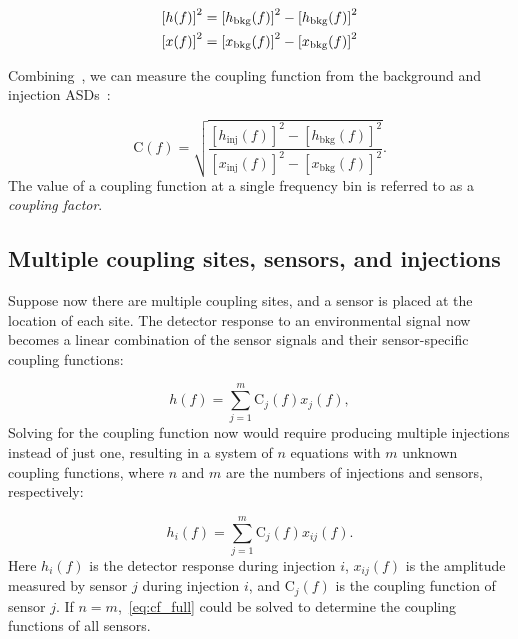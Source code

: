 \begin{align}
	\left[h(f)\right]^2 &= \left[h_{\textrm{bkg}}(f)\right]^2 - \left[h_{\textrm{bkg}}(f)\right]^2 \label{eq:h_inj}\\
	\left[x(f)\right]^2 &= \left[x_{\textrm{bkg}}(f)\right]^2 - \left[x_{\textrm{bkg}}(f)\right]^2 \label{eq:x_inj}
\end{align}

Combining~, we can measure the coupling function from the background and injection \acp{ASD}~\citep{Kruk_2016, pem_code}:

\begin{equation}\label{eq:cf}
	\mathrm{C}(f) = \sqrt{\frac{[h_{\textrm{inj}}(f)]^2 - [h_{\textrm{bkg}}(f)]^2}{[x_{\textrm{inj}}(f)]^2 - [x_{\textrm{bkg}}(f)]^2}}.
\end{equation}
The value of a coupling function at a single frequency bin is referred to as a \textit{coupling factor}.

\subsection{Multiple coupling sites, sensors, and injections}

Suppose now there are multiple coupling sites, and a sensor is placed at the location of each site.
The detector response to an environmental signal now becomes a linear combination of the sensor signals and their sensor-specific coupling functions:

\begin{equation}\label{eq:cf_model_expanded}
	h(f) = \sum_{j=1}^{m} \mathrm{C}_j(f) x_{j}(f),
\end{equation}
Solving for the coupling function now would require producing multiple injections instead of just one, resulting in a system of $n$ equations with $m$ unknown coupling functions, where $n$ and $m$ are the numbers of injections and sensors, respectively:

\begin{equation}\label{eq:cf_full}
	h_i(f) = \sum_{j=1}^{m} \mathrm{C}_j(f) x_{ij}(f).
\end{equation}
Here $h_i(f)$ is the detector response during injection $i$, $x_{ij}(f)$ is the amplitude measured by sensor $j$ during injection $i$, and $\mathrm{C}_j(f)$ is the coupling function of sensor $j$.
If $n = m$,~\cref{eq:cf_full} could be solved to determine the coupling functions of all sensors.

